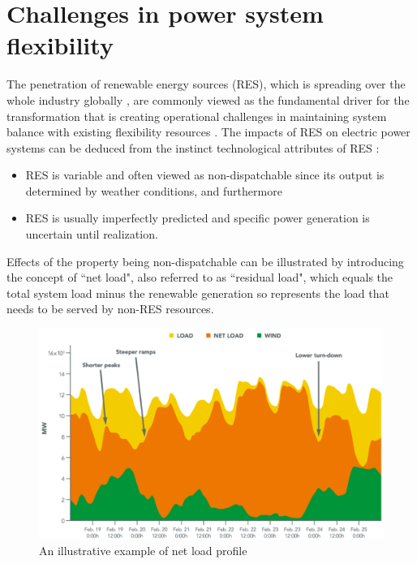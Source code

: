 \section{Challenges in power system flexibility}
The penetration of renewable energy sources (RES), which is spreading over the whole industry globally \cite{Agency2016}, are commonly viewed as the fundamental driver for the transformation that is creating operational challenges in maintaining system balance with existing flexibility resources \cite{Cochran2014,Wang2017,Lund2015,FraunhoferIWES2015,Muller2016,Kwon2014,Kondziella2016,Papaefthymiou2016,Alizadeh2016,Bertsch2016}. The impacts of RES on electric power systems can be deduced from the instinct technological attributes of RES \cite{Kondziella2016,Edenhofer2013}:
\begin{itemize}
	\item RES is variable and often viewed as non-dispatchable since its output is determined by weather conditions, and furthermore
	\item RES is usually imperfectly predicted and specific power generation is uncertain until realization.
\end{itemize}

Effects of the property being non-dispatchable can be illustrated by introducing the concept of ``net load", also referred to as ``residual load", which equals the total system load minus the renewable generation so represents the load that needs to be served by non-RES resources\cite{Cochran2014,Muller2016,Ueckerdt2015}.

\begin{figure}[h!]
	\centering
	\includegraphics[width=0.9\linewidth]{Figures/NetLoad}
	\caption{An illustrative example of net load profile \cite{Cochran2014}}
	\label{fig:net-load}
\end{figure}

